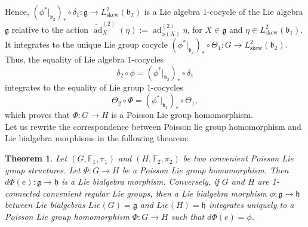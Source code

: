 \documentclass[11pt,reqno]{amsart}
\newtheorem{theorem}{Theorem}[section]
\theoremstyle{definition}
\numberwithin{equation}{section}
\begin{document}
Hence, $(\phi^*|_{\mathfrak{b}_2})_* \circ \delta_1 : \mathfrak{g} \to L^2_{\text{skew}}(\mathfrak{b}_2)$ is a Lie algebra $1$-cocycle of the Lie algebra $\mathfrak{g}$ relative to the action $\widetilde{\operatorname{ad}}^{(2)}_X(\eta) := \operatorname{ad}_{\phi(X)}^{(2)}\eta$, for $X \in \mathfrak{g}$ and $\eta \in L^2_{\text{skew}}(\mathfrak{b}_1)$. It integrates to the unique Lie group cocycle $(\phi^*|_{\mathfrak{b}_2})_* \circ \Theta_1 : G \to L^2_{\text{skew}}(\mathfrak{b}_2)$. Thus, the equality of Lie algebra $1$-cocycles
\[
\delta_2 \circ \phi = (\phi^*|_{\mathfrak{b}_2})_* \circ \delta_1
\]
integrates to the equality of Lie group $1$-cocycles
\[
\Theta_2 \circ \Phi = (\phi^*|_{\mathfrak{b}_2})_* \circ \Theta_1,
\]
which proves that $\Phi: G \to H$ is a Poisson Lie group homomorphism.\\

 Let us rewrite the correspondence between Poisson lie group homomorphism and Lie bialgebra morphisms in the following theorem:
\begin{theorem}
Let $(G, \mathbb F_1, \pi_1)$ and $(H, \mathbb F_2, \pi_2)$ be two convenient Poisson Lie group structures. Let $\Phi: G\to H$ be a Poisson Lie group homomorphism. Then $d\Phi(e): \mathfrak g \to \mathfrak h$  is a Lie bialgebra morphism. Conversely, if $G$ and $H$ are 1-connected convenient regular Lie groups, then a Lie bialgebra morphism $\phi:\mathfrak g \to \mathfrak h$ between Lie bialgebras $Lie(G)=\mathfrak g$ and $Lie(H)=\mathfrak h$ integrates uniquely to a Poisson Lie group homomorphism $\Phi: G\to H$ such that $d\Phi(e)=\phi$.
\end{theorem}


 \begin{center}
\end{center}
\end{document}
